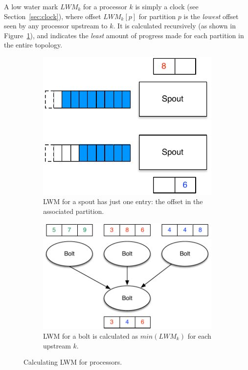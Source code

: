 \documentclass[10pt,nocopyrightspace]{sigplanconf}
\begin{document}
A low water mark $LWM_k$ for a processor $k$ is simply a clock (see
Section~\ref{sec:clock}), where offset $LWM_k[p]$ for partition $p$ is the
\emph{lowest} offset seen by any processor upstream to $k$. It is calculated
recursively (as shown in Figure~\ref{fig:lwm-calculation}), and indicates the
\emph{least} amount of progress made for each partition in the entire topology.

\begin{figure}
  \begin{subfigure}[t]{0.45\columnwidth}
    \includegraphics[width=\columnwidth]{images/lwm_spouts.pdf}
    \caption{LWM for a spout has just one entry: the offset in the associated
    partition.}
  \end{subfigure}
  \hfill%
  \begin{subfigure}[t]{0.45\columnwidth}
    \includegraphics[width=\columnwidth]{images/lwm_bolts.pdf}
    \caption{LWM for a bolt is calculated as $min(LWM_k)$ for each upstream
    $k$.}
  \end{subfigure}
  \caption{Calculating LWM for processors.}\label{fig:lwm-calculation}
\end{figure}
\end{document}
